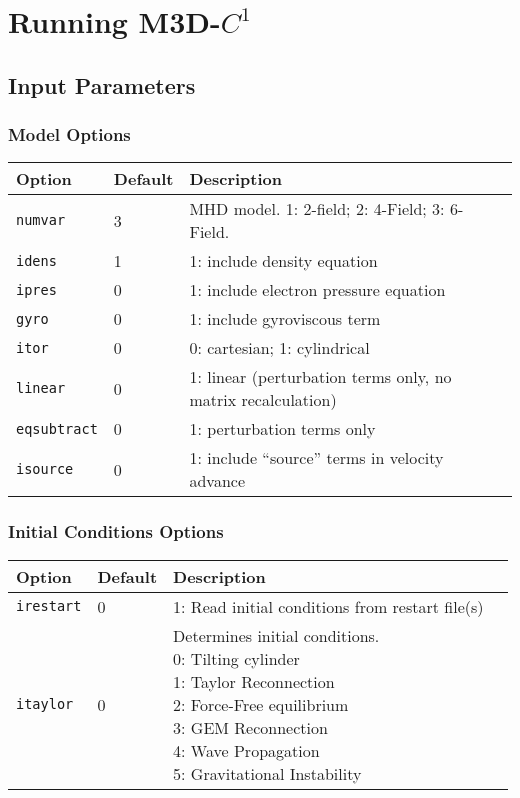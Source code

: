 \documentclass[letterpaper]{book}
\newcommand{\codename}{M3D-$C^1$}
\begin{document}
\chapter{Running \codename}

\section{Input Parameters}

\subsection{Model Options}

\begin{tabular}{llll}
  \textbf{Option}&\textbf{Default}&\textbf{Description}\\
  \hline
  \texttt{numvar} & 3   & MHD model. 1: 2-field;  2: 4-Field;  3: 6-Field.\\
  \texttt{idens}  & 1   & 1: include density equation\\
  \texttt{ipres}  & 0   & 1: include electron pressure equation\\
  \texttt{gyro}   & 0   & 1: include gyroviscous term\\
  \texttt{itor}   & 0   & 0: cartesian; 1: cylindrical\\
  \texttt{linear} & 0   & \parbox[t]{3in}{1: linear (perturbation terms only,
    no matrix  recalculation)}\\
  \texttt{eqsubtract}& 0& 1: perturbation terms only\\
  \texttt{isource}   & 0& 1: include ``source'' terms in velocity
    advance\\
\end{tabular}


\subsection{Initial Conditions Options}

\begin{tabular}{llll}
  \textbf{Option}&\textbf{Default}&\textbf{Description}\\
  \hline
  \texttt{irestart} & 0 & 1: Read initial conditions from restart file(s)\\
  \texttt{itaylor}  & 0 & \parbox[t]{2in}{Determines initial
  conditions.\\
  0: Tilting cylinder\\
  1: Taylor Reconnection\\
  2: Force-Free equilibrium\\
  3: GEM Reconnection\\
  4: Wave Propagation\\
  5: Gravitational Instability\\}
\end{tabular}
\end{document}
